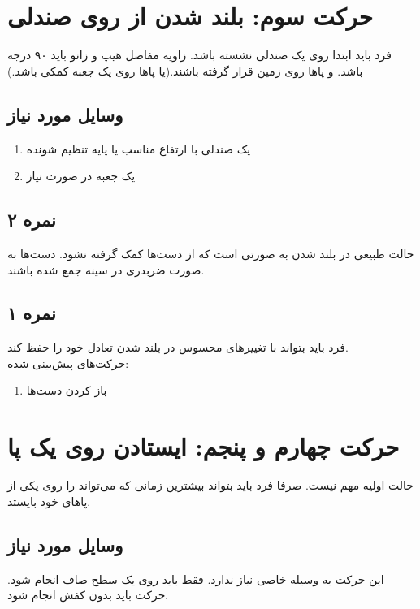 \documentclass[12pt]{report}
\begin{document}
	\section*{حرکت سوم: بلند شدن از روی صندلی}
	فرد باید ابتدا روی یک صندلی نشسته باشد. زاویه مفاصل هیپ و زانو باید ۹۰ درجه باشد. و پاها روی زمین قرار گرفته باشند.(یا پاها روی یک جعبه کمکی باشد.)
	\subsection*{وسایل مورد نیاز}
	\begin{enumerate}
		\item یک صندلی با ارتفاع مناسب یا پایه تنظیم شونده
		\item یک جعبه در صورت نیاز
	\end{enumerate}
	
	\subsection*{نمره ۲}
	حالت طبیعی در بلند شدن به صورتی است که از دست‌ها کمک گرفته نشود. دست‌ها به صورت ضربدری در سینه جمع شده باشند.
	\subsection*{نمره ۱}
	فرد باید بتواند با تغییر‌های محسوس در بلند شدن تعادل خود را حفظ کند.\\
	حرکت‌های پیش‌بینی شده:
	\begin{enumerate}
		\item باز کردن دست‌ها
	\end{enumerate}
	\newpage
	
	\section*{حرکت چهارم و پنجم: ایستادن روی یک پا}
	حالت اولیه مهم نیست. صرفا فرد باید بتواند بیشترین زمانی که می‌تواند را روی یکی از پاهای خود بایستد.
	\subsection*{وسایل مورد نیاز}
	این حرکت به وسیله خاصی نیاز ندارد. فقط باید روی یک سطح صاف انجام شود. حرکت باید بدون کفش انجام شود.
\end{document}
